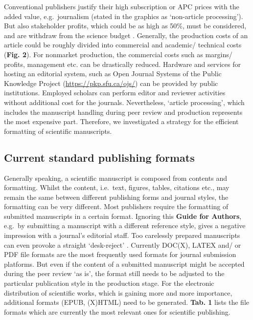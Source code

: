 \documentclass[10pt,fleqn]{wlpeerj}
\begin{document}
Conventional
publishers
justify
their
high
subscription
or
APC
prices
with
the
added
value,
e.g.~journalism
(stated
in
the
graphics
as
`non-article
processing').
But
also
stakeholder
profits,
which
could
be as
high
as
50\%,
must
be
considered,
and
are
withdraw
from
the
science
budget
\citep{van_noorden_open_2013}.
Generally,
the
production
costs
of an
article
could
be
roughly
divided
into
commercial
and
academic/
technical
costs
(\textbf{Fig.
2}).
For
nonmarket
production,
the
commercial
costs
such
as
margins/
profits,
management
etc.
can
be
drastically
reduced.
Hardware
and
services
for
hosting
an
editorial
system,
such
as
Open
Journal
Systems
of
the
Public
Knowledge
Project
(\url{https://pkp.sfu.ca/ojs/})
can
be
provided
by
public
institutions.
Employed
scholars
can
perform
editor
and
reviewer
activities
without
additional
cost
for
the
journals.
Nevertheless,
`article
processing',
which
includes
the
manuscript
handling
during
peer
review
and
production
represents
the
most
expensive
part.
Therefore,
we
investigated
a
strategy
for
the
efficient
formatting
of
scientific
manuscripts.

\subsection{Current
standard
publishing
formats}\label{current-standard-publishing-formats}

Generally
speaking,
a
scientific
manuscript
is
composed
from
contents
and
formatting.
Whilst
the
content,
i.e.~text,
figures,
tables,
citations
etc.,
may
remain
the
same
between
different
publishing
forms
and
journal
styles,
the
formatting
can
be
very
different.
Most
publishers
require
the
formatting
of
submitted
manuscripts
in a
certain
format.
Ignoring
this
\textbf{Guide
for
Authors},
e.g.~by
submitting
a
manuscript
with
a
different
reference
style,
gives
a
negative
impression
with
a
journal's
editorial
staff.
Too
carelessly
prepared
manuscripts
can
even
provoke
a
straight
`desk-reject'
\citep{volmer_how_2016}.
Currently
DOC(X),
LATEX
and/
or
PDF
file
formats
are
the
most
frequently
used
formats
for
journal
submission
platforms.
But
even
if
the
content
of a
submitted
manuscript
might
be
accepted
during
the
peer
review
`as
is',
the
format
still
needs
to be
adjusted
to
the
particular
publication
style
in
the
production
stage.
For
the
electronic
distribution
of
scientific
works,
which
is
gaining
more
and
more
importance,
additional
formats
(EPUB,
(X)HTML)
need
to be
generated.
\textbf{Tab.
1}
lists
the
file
formats
which
are
currently
the
most
relevant
ones
for
scientific
publishing.
\end{document}
